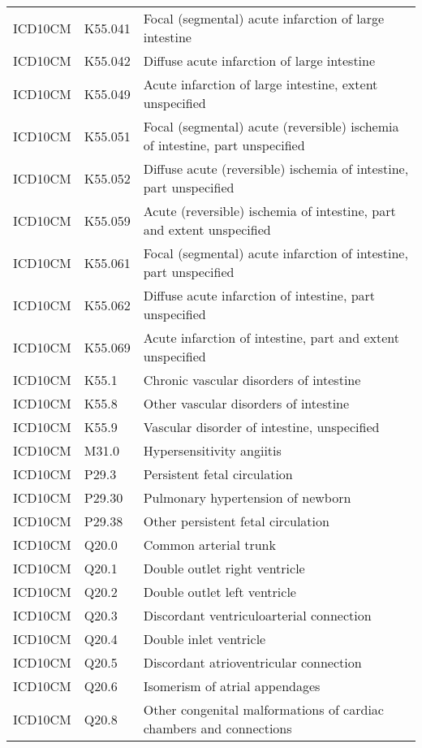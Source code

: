 \begin{longtable}{p{}p{}p{}}
  ICD10CM & K55.041 & Focal (segmental) acute infarction of large intestine \\ 
  ICD10CM & K55.042 & Diffuse acute infarction of large intestine \\ 
  ICD10CM & K55.049 & Acute infarction of large intestine, extent unspecified \\ 
  ICD10CM & K55.051 & Focal (segmental) acute (reversible) ischemia of intestine, part unspecified \\ 
  ICD10CM & K55.052 & Diffuse acute (reversible) ischemia of intestine, part unspecified \\ 
  ICD10CM & K55.059 & Acute (reversible) ischemia of intestine, part and extent unspecified \\ 
  ICD10CM & K55.061 & Focal (segmental) acute infarction of intestine, part unspecified \\ 
  ICD10CM & K55.062 & Diffuse acute infarction of intestine, part unspecified \\ 
  ICD10CM & K55.069 & Acute infarction of intestine, part and extent unspecified \\ 
  ICD10CM & K55.1 & Chronic vascular disorders of intestine \\ 
  ICD10CM & K55.8 & Other vascular disorders of intestine \\ 
  ICD10CM & K55.9 & Vascular disorder of intestine, unspecified \\ 
  ICD10CM & M31.0 & Hypersensitivity angiitis \\ 
  ICD10CM & P29.3 & Persistent fetal circulation \\ 
  ICD10CM & P29.30 & Pulmonary hypertension of newborn \\ 
  ICD10CM & P29.38 & Other persistent fetal circulation \\ 
  ICD10CM & Q20.0 & Common arterial trunk \\ 
  ICD10CM & Q20.1 & Double outlet right ventricle \\ 
  ICD10CM & Q20.2 & Double outlet left ventricle \\ 
  ICD10CM & Q20.3 & Discordant ventriculoarterial connection \\ 
  ICD10CM & Q20.4 & Double inlet ventricle \\ 
  ICD10CM & Q20.5 & Discordant atrioventricular connection \\ 
  ICD10CM & Q20.6 & Isomerism of atrial appendages \\ 
  ICD10CM & Q20.8 & Other congenital malformations of cardiac chambers and connections \\ 

\end{longtable}
